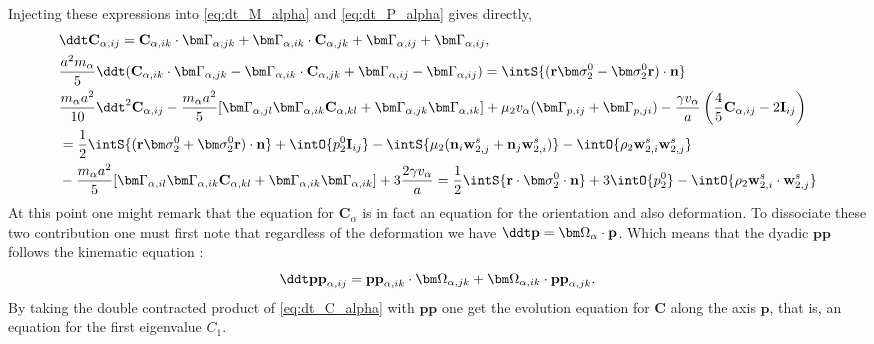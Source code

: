 Injecting these expressions into \ref{eq:dt_M_alpha} and \ref{eq:dt_P_alpha} gives directly, 
\begin{align}
    \label{eq:dt_C_alpha}
    &\ddt \textbf{C}_{\alpha,ij}
    = \textbf{C}_{\alpha,ik} \cdot \bm\Gamma_{\alpha,jk}
    +  \bm\Gamma_{\alpha,ik} \cdot \textbf{C}_{\alpha,jk}
    +  \bm\Gamma_{\alpha,ij} + \bm\Gamma_{\alpha,ij}
    ,\\
    &\frac{a^2  m_\alpha}{5} \ddt( 
        \textbf{C}_{\alpha,ik} \cdot \bm\Gamma_{\alpha,jk}
        -  \bm\Gamma_{\alpha,ik} \cdot \textbf{C}_{\alpha,jk}
        +  
        \bm\Gamma_{\alpha,ij} - \bm\Gamma_{\alpha,ij}
    )
    =  
    \intS{(\textbf{r}\bm\sigma_2^0- \bm\sigma_2^0\textbf{r})\cdot \textbf{n}}\\
    &\frac{m_\alpha a^2}{10}\ddt^2 \textbf{C}_{\alpha,ij}
    - \frac{m_\alpha a^2}{5}[
        \bm\Gamma_{\alpha,jl}\bm\Gamma_{\alpha,ik} \textbf{C}_{\alpha,kl} 
        + \bm\Gamma_{\alpha,jk}\bm\Gamma_{\alpha,ik} 
    ]
    + \mu_2 v_\alpha (\bm \Gamma_{p,ij}+\bm \Gamma_{p,ji})
    - \frac{ \gamma v_\alpha }{ a} \left(\frac{4}{5}
        \textbf{C}_{\alpha,ij}
        -2 \textbf{I}_{ij}
    \right)\nonumber\\
    &= \frac{1}{2}\intS{(\textbf{r}\bm\sigma_2^0+ \bm\sigma_2^0\textbf{r})\cdot \textbf{n}}
    + \intO{p_2^0 \textbf{I}_{ij}}
    - \intS{\mu_2 (\textbf{n}_i \textbf{w}_{2,j}^s + \textbf{n}_j \textbf{w}_{2,i}^s)}
    - \intO{\rho_2 \textbf{w}_{2,i}^s\textbf{w}_{2,j}^s} \\
    &- \frac{m_\alpha a^2}{5}[
        \bm\Gamma_{\alpha,il}\bm\Gamma_{\alpha,ik} \textbf{C}_{\alpha,kl} 
        + \bm\Gamma_{\alpha,ik}\bm\Gamma_{\alpha,ik} 
    ]
    + 3 \frac{ 2 \gamma v_\alpha }{ a} 
= \frac{1}{2}\intS{\textbf{r}\cdot \bm\sigma_2^0\cdot \textbf{n}}
    + 3 \intO{p_2^0 }
    - \intO{\rho_2 \textbf{w}_{2,i}^s\cdot\textbf{w}_{2,j}^s} 
\end{align}
At this point one might remark that the equation for $\textbf{C}_\alpha$ is in fact an equation for the orientation and also deformation. 
To dissociate these two contribution one must first note that regardless of the deformation we have $\ddt \textbf{p} = \bm\Omega_\alpha \cdot \textbf{p}$.
Which means that the dyadic $\textbf{pp}$ follows the kinematic equation :
\begin{equation*}
    \ddt \textbf{pp}_{\alpha,ij}
    =  \textbf{pp}_{\alpha,ik} \cdot \bm\Omega_{\alpha,jk}
    +  \bm\Omega_{\alpha,ik} \cdot \textbf{pp}_{\alpha,jk}.
\end{equation*}
By taking the double contracted product of \ref{eq:dt_C_alpha} with $\textbf{pp}$ one get the evolution equation for $\textbf{C}$ along the axis $\textbf{p}$, that is, an equation for the first eigenvalue $C_1$.
